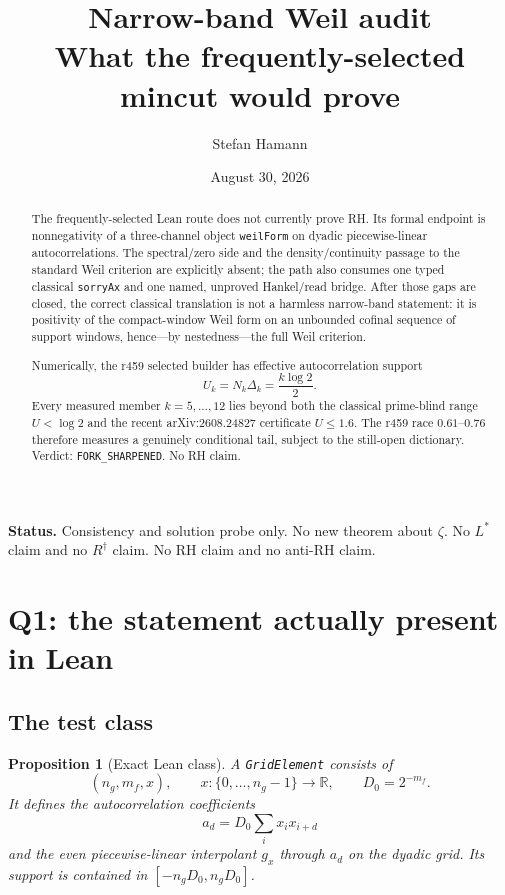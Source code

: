 \documentclass[11pt]{article}
\title{\bfseries Narrow-band Weil audit\\[2mm]
\large What the frequently-selected mincut would prove}
\author{Stefan Hamann}
\date{August 30, 2026}
\newtheorem{prop}{Proposition}
\newcommand{\Rd}{R^{\dagger}}
\begin{document}
\maketitle

\begin{abstract}\noindent
The frequently-selected Lean route does not currently prove RH.
Its formal endpoint is nonnegativity of a three-channel object
\texttt{weilForm} on dyadic piecewise-linear autocorrelations.
The spectral/zero side and the density/continuity passage to the
standard Weil criterion are explicitly absent; the path also
consumes one typed classical \texttt{sorryAx} and one named,
unproved Hankel/read bridge.  After those gaps are closed, the
correct classical translation is not a harmless narrow-band
statement: it is positivity of the compact-window Weil form on
an unbounded cofinal sequence of support windows, hence---by
nestedness---the full Weil criterion.

Numerically, the r459 selected builder has effective
autocorrelation support
\[
 U_k=N_k\Delta_k=\frac{k\log2}{2}.
\]
Every measured member $k=5,\ldots,12$ lies beyond both the
classical prime-blind range $U<\log2$ and the recent
arXiv:2608.24827 certificate $U\le1.6$.  The r459 race
$0.61$--$0.76$ therefore measures a genuinely conditional tail,
subject to the still-open dictionary.  Verdict:
\texttt{FORK\_SHARPENED}.  No RH claim.
\end{abstract}

\medskip\noindent
\textbf{Status.}\enspace
Consistency and solution probe only.
No new theorem about $\zeta$.
No $L^*$ claim and no $\Rd$ claim.
No RH claim and no anti-RH claim.

\section{Q1: the statement actually present in Lean}

\subsection{The test class}

\begin{prop}[Exact Lean class]\label{prop:class}
A \texttt{GridElement} consists of
\[
 (n_g,m_f,x),\qquad x:\{0,\ldots,n_g-1\}\longrightarrow\mathbb R,
 \qquad D_0=2^{-m_f}.
\]
It defines the autocorrelation coefficients
\[
 a_d=D_0\sum_i x_i x_{i+d}
\]
and the even piecewise-linear interpolant $g_x$ through
$a_d$ on the dyadic grid.  Its support is contained in
$[-n_gD_0,n_gD_0]$.
\end{prop}
\end{document}
